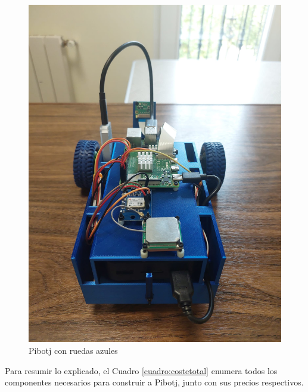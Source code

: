 \begin{figure} [h!]
	\begin{center}
		\includegraphics[width=12cm]{figs/cap5/ra.jpeg}
	\end{center}
	\caption{Pibotj con ruedas azules} 
	\label{fig:ra}
\end{figure}


Para resumir lo explicado, el Cuadro \ref{cuadro:costetotal} enumera todos los componentes necesarios para construir a Pibotj, junto con sus precios respectivos.

